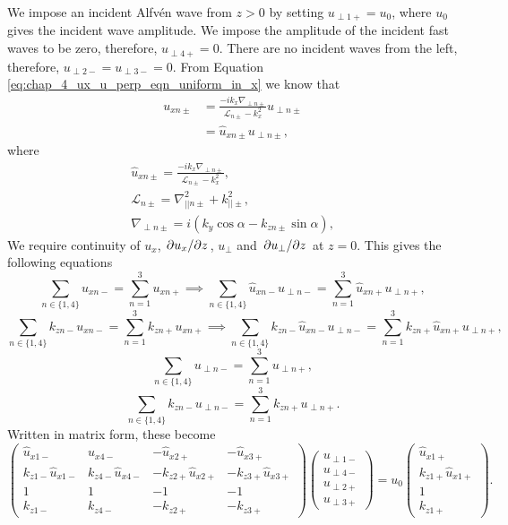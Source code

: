 We impose an incident Alfv\'en wave from $z>0$ by setting $u_{\perp1+}=u_0$, where $u_0$ gives the incident wave amplitude. We impose the amplitude of the incident fast waves to be zero, therefore, $u_{\perp 4+}=0$. There are no incident waves from the left, therefore, $u_{\perp2-}=u_{\perp3-}=0$. From Equation \eqref{eq:chap_4_ux_u_perp_eqn_uniform_in_x} we know that
\begin{equation}
    \label{eq:uxn_pm_oblique_field_piecewise_constant_density}
    \begin{aligned}
    u_{x n\pm} &= \frac{-ik_x\nabla_{\perp n\pm}}{\mathcal{L}_{n\pm}-k_x^2}u_{\perp n\pm} \\
    &= \hat{u}_{x n\pm}u_{\perp n\pm},
\end{aligned}
\end{equation}
where
\begin{gather}
    \hat{u}_{x n\pm} = \frac{-ik_x\nabla_{\perp n\pm}}{\mathcal{L}_{n\pm}-k_x^2}, \\
    \mathcal{L}_{n\pm}=\nabla_{||n\pm}^2+k_{||\pm}^2, \\
    \nabla_{\perp n\pm} = i(k_y\cos\alpha - k_{zn\pm}\sin\alpha),
\end{gather}
We require continuity of $u_x$, $\pdv*{u_x}{z}$, $u_\perp$ and $\pdv*{u_\perp}{z}$ at $z=0$. This gives the following equations
\[\sum_{n\in\{1,4\}}u_{xn-}=\sum_{n=1}^3u_{xn+}\implies \sum_{n\in\{1,4\}}\hat{u}_{xn-}u_{\perp n-}=\sum_{n=1}^3\hat{u}_{xn+}u_{\perp n+},\]
\[\sum_{n\in\{1,4\}}k_{zn-}u_{xn-}=\sum_{n=1}^3k_{zn+}u_{xn+}\implies \sum_{n\in\{1,4\}}k_{zn-}\hat{u}_{xn-}u_{\perp n-}=\sum_{n=1}^3k_{zn+}\hat{u}_{xn+}u_{\perp n+},\]
\[\sum_{n\in\{1,4\}}u_{\perp n-}=\sum_{n=1}^3u_{\perp n+},\]
\[\sum_{n\in\{1,4\}}k_{zn-}u_{\perp n-}=\sum_{n=1}^3k_{zn+}u_{\perp n+}.\]
Written in matrix form, these become
\[
    \begin{pmatrix}
    \hat{u}_{x1-} & \hat{u}_{x4-} & -\hat{u}_{x2+} & -\hat{u}_{x3+} \\
    k_{z1-}\hat{u}_{x1-} & k_{z4-}\hat{u}_{x4-} & -k_{z2+}\hat{u}_{x2+} & -k_{z3+}\hat{u}_{x3+} \\
    1 & 1 & -1 &-1 \\
    k_{z1-} & k_{z4-} & -k_{z2+} & -k_{z3+}
    \end{pmatrix}
    \begin{pmatrix}
    u_{\perp 1-} \\
    u_{\perp 4-} \\
    u_{\perp 2+} \\
    u_{\perp 3+}
    \end{pmatrix}
    =u_0
    \begin{pmatrix}
    \hat{u}_{x1+} \\
    k_{z1+}\hat{u}_{x1+} \\
    1 \\
    k_{z1+}
    \end{pmatrix}.
\]
